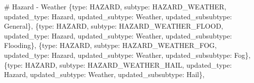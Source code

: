 \documentclass[
  letterpaper,
  DIV=11,
  numbers=noendperiod]{scrartcl}
\newenvironment{Shaded}{\begin{snugshade}}{\end{snugshade}}
\newcommand{\CommentTok}[1]{\textcolor[rgb]{0.37,0.37,0.37}{#1}}
\newcommand{\NormalTok}[1]{\textcolor[rgb]{0.00,0.23,0.31}{#1}}
\newcommand{\StringTok}[1]{\textcolor[rgb]{0.13,0.47,0.30}{#1}}
\begin{document}
\begin{Shaded}
\begin{Highlighting}[]
    \CommentTok{\# Hazard {-} Weather}
\NormalTok{    \{}\StringTok{\textquotesingle{}type\textquotesingle{}}\NormalTok{: }\StringTok{\textquotesingle{}HAZARD\textquotesingle{}}\NormalTok{, }\StringTok{\textquotesingle{}subtype\textquotesingle{}}\NormalTok{: }\StringTok{\textquotesingle{}HAZARD\_WEATHER\textquotesingle{}}\NormalTok{, }
     \StringTok{\textquotesingle{}updated\_type\textquotesingle{}}\NormalTok{: }\StringTok{\textquotesingle{}Hazard\textquotesingle{}}\NormalTok{, }\StringTok{\textquotesingle{}updated\_subtype\textquotesingle{}}\NormalTok{: }\StringTok{\textquotesingle{}Weather\textquotesingle{}}\NormalTok{, }\StringTok{\textquotesingle{}updated\_subsubtype\textquotesingle{}}\NormalTok{: }\StringTok{\textquotesingle{}General\textquotesingle{}}\NormalTok{\},}
\NormalTok{    \{}\StringTok{\textquotesingle{}type\textquotesingle{}}\NormalTok{: }\StringTok{\textquotesingle{}HAZARD\textquotesingle{}}\NormalTok{, }\StringTok{\textquotesingle{}subtype\textquotesingle{}}\NormalTok{: }\StringTok{\textquotesingle{}HAZARD\_WEATHER\_FLOOD\textquotesingle{}}\NormalTok{, }
     \StringTok{\textquotesingle{}updated\_type\textquotesingle{}}\NormalTok{: }\StringTok{\textquotesingle{}Hazard\textquotesingle{}}\NormalTok{, }\StringTok{\textquotesingle{}updated\_subtype\textquotesingle{}}\NormalTok{: }\StringTok{\textquotesingle{}Weather\textquotesingle{}}\NormalTok{, }\StringTok{\textquotesingle{}updated\_subsubtype\textquotesingle{}}\NormalTok{: }\StringTok{\textquotesingle{}Flooding\textquotesingle{}}\NormalTok{\},}
\NormalTok{    \{}\StringTok{\textquotesingle{}type\textquotesingle{}}\NormalTok{: }\StringTok{\textquotesingle{}HAZARD\textquotesingle{}}\NormalTok{, }\StringTok{\textquotesingle{}subtype\textquotesingle{}}\NormalTok{: }\StringTok{\textquotesingle{}HAZARD\_WEATHER\_FOG\textquotesingle{}}\NormalTok{, }
     \StringTok{\textquotesingle{}updated\_type\textquotesingle{}}\NormalTok{: }\StringTok{\textquotesingle{}Hazard\textquotesingle{}}\NormalTok{, }\StringTok{\textquotesingle{}updated\_subtype\textquotesingle{}}\NormalTok{: }\StringTok{\textquotesingle{}Weather\textquotesingle{}}\NormalTok{, }\StringTok{\textquotesingle{}updated\_subsubtype\textquotesingle{}}\NormalTok{: }\StringTok{\textquotesingle{}Fog\textquotesingle{}}\NormalTok{\},}
\NormalTok{    \{}\StringTok{\textquotesingle{}type\textquotesingle{}}\NormalTok{: }\StringTok{\textquotesingle{}HAZARD\textquotesingle{}}\NormalTok{, }\StringTok{\textquotesingle{}subtype\textquotesingle{}}\NormalTok{: }\StringTok{\textquotesingle{}HAZARD\_WEATHER\_HAIL\textquotesingle{}}\NormalTok{, }
     \StringTok{\textquotesingle{}updated\_type\textquotesingle{}}\NormalTok{: }\StringTok{\textquotesingle{}Hazard\textquotesingle{}}\NormalTok{, }\StringTok{\textquotesingle{}updated\_subtype\textquotesingle{}}\NormalTok{: }\StringTok{\textquotesingle{}Weather\textquotesingle{}}\NormalTok{, }\StringTok{\textquotesingle{}updated\_subsubtype\textquotesingle{}}\NormalTok{: }\StringTok{\textquotesingle{}Hail\textquotesingle{}}\NormalTok{\},}

\end{Highlighting}
\end{Shaded}
\end{document}
